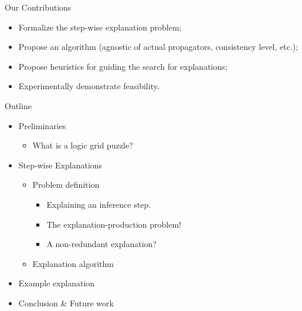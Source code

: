 \documentclass{beamer}
\begin{document}
\begin{frame}{Our Contributions}

    \begin{itemize}
        \item Formalize the step-wise explanation problem;
        \item Propose an algorithm (agnostic of actual propagators, consistency level, etc.);
        \item Propose heuristics for guiding the search for explanations;
        \item Experimentally demonstrate feasibility.
    \end{itemize}
\end{frame}


\begin{frame}{Outline}

    \begin{itemize}
        \item Preliminaries
              \begin{itemize}
                  \item What is a logic grid puzzle?
              \end{itemize}
        \item Step-wise Explanations
              \begin{itemize}
                  \item Problem definition
                        \begin{itemize}
                            \item Explaining an inference step.
                            \item The explanation-production problem!
                            \item A non-redundant explanation?
                        \end{itemize}
                  \item Explanation algorithm
              \end{itemize}
        \item Example explanation
        \item Conclusion \& Future work
    \end{itemize}
\end{frame}
\end{document}
